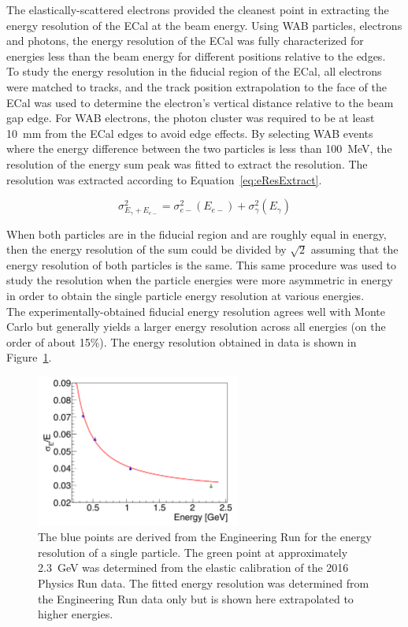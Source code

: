 The elastically-scattered electrons provided the cleanest point in extracting the energy resolution of the ECal at the beam energy. Using WAB particles, electrons and photons, the energy resolution of the ECal was fully characterized for energies less than the beam energy for different positions relative to the edges.\\
\indent To study the energy resolution in the fiducial region of the ECal, all electrons were matched to tracks, and the track position extrapolation to the face of the ECal was used to determine the electron's vertical distance relative to the beam gap edge. For WAB electrons, the photon cluster was required to be at least 10~mm from the ECal edges to avoid edge effects. By selecting WAB events where the energy difference between the two particles is less than 100~MeV, the resolution of the energy sum peak was fitted to extract the resolution. The resolution was extracted according to Equation~\eqref{eq:eResExtract}.

\begin{equation}
	\label{eq:eResExtract}
	\sigma_{E_{\gamma}+E_{e-}}^2 = \sigma_{e-}^2(E_{e-})+\sigma_{\gamma}^2(E_{\gamma})
\end{equation}

When both particles are in the fiducial region and are roughly equal in energy, then the energy resolution of the sum could be divided by $\sqrt{2}$ assuming that the energy resolution of both particles is the same. This same procedure was used to study the resolution when the particle energies were more asymmetric in energy in order to obtain the single particle energy resolution at various energies. \\
\indent The experimentally-obtained fiducial energy resolution agrees well with Monte Carlo but generally yields a larger energy resolution across all energies (on the order of about 15$\%$). The energy resolution obtained in data is shown in Figure~\ref{Figure:eResData}.

\begin{figure}[htb]
  \centering
      \includegraphics[width=0.6\textwidth]{pics/performance/eResData.png}
  \caption[Energy resolution of the ECal found in data]{The blue points are derived from the Engineering Run for the energy resolution of a single particle. The green point at approximately 2.3~GeV was determined from the elastic calibration of the 2016 Physics Run data. The fitted energy resolution was determined from the Engineering Run data only but is shown here extrapolated to higher energies.}
  \label{Figure:eResData}
\end{figure}

